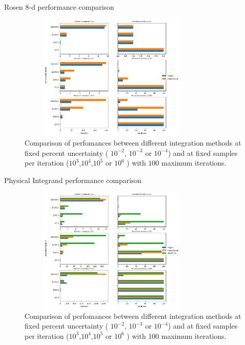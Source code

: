 \documentclass[t,handout,professionalfonts]{beamer}
\begin{document}
\begin{frame}{Rosen 8-d performance comparison}
	\tiny
	\vspace{-0.4cm}
	\begin{figure}
		\includegraphics[height=6cm,width=9cm]{../performance_plots/rosen8-d_no_stratified.png}
		\caption{Comparison of perfomances between different integration methods at fixed percent uncertainty ( $10^{-2}$, $10^{-3}$ or $10^{-4}$) and at fixed samples per iteration ($10^3$,$10^4$,$10^5$ or $10^6$ ) with $100$ maximum iterations.}
	\end{figure}
	
\end{frame}

\begin{frame}{Physical Integrand performance comparison}
	\tiny
	\vspace{-0.4cm}
	\begin{figure}
		\includegraphics[height=6cm,width=9cm]{../performance_plots/dy_aa.png}
		\caption{Comparison of perfomances between different integration methods at fixed percent uncertainty ( $10^{-2}$, $10^{-3}$ or $10^{-4}$) and at fixed samples per iteration ($10^3$,$10^4$,$10^5$ or $10^6$ ) with $100$ maximum iterations.}
	\end{figure}
	
\end{frame}
\end{document}
